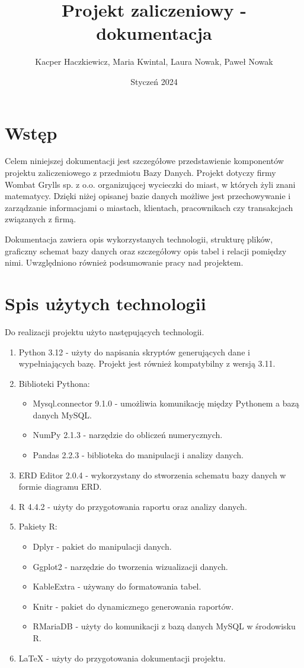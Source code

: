\documentclass{article}
\author{Kacper Haczkiewicz, Maria Kwintal, Laura Nowak, Paweł Nowak}
\title{\textbf{Projekt zaliczeniowy - dokumentacja}}
\date{Styczeń 2024}
\begin{document}
	
	\maketitle
	
	\section{Wstęp}
	
	Celem niniejszej dokumentacji jest szczegółowe przedstawienie komponentów projektu zaliczeniowego z przedmiotu Bazy Danych. Projekt dotyczy firmy Wombat Grylls sp. z o.o. organizującej wycieczki do miast, w których żyli znani matematycy. Dzięki niżej opisanej bazie danych możliwe jest przechowywanie i zarządzanie informacjami o miastach, klientach, pracownikach czy transakcjach związanych z firmą.
	
	Dokumentacja zawiera opis wykorzystanych technologii, strukturę plików, graficzny schemat bazy danych oraz szczegółowy opis tabel i relacji pomiędzy nimi. Uwzględniono również podsumowanie pracy nad projektem.
	
	\section{Spis użytych technologii}
	
	Do realizacji projektu użyto następujących technologii.
	\begin{enumerate}
		\item Python 3.12 - użyty do napisania skryptów generujących dane i wypełniających bazę. Projekt jest również kompatybilny z wersją 3.11.
		\item Biblioteki Pythona:
		\begin{itemize}
			\item Mysql.connector 9.1.0 - umożliwia komunikację między Pythonem a bazą danych MySQL.
			\item NumPy 2.1.3 - narzędzie do obliczeń numerycznych.
			\item Pandas 2.2.3 - biblioteka do manipulacji i analizy danych.
		\end{itemize}
		\item ERD Editor 2.0.4 - wykorzystany do stworzenia schematu bazy danych w formie diagramu ERD.
		\item R 4.4.2 - użyty do przygotowania raportu oraz analizy danych.
		\item Pakiety R:
		\begin{itemize}
			\item Dplyr - pakiet do manipulacji danych.
			\item Ggplot2 - narzędzie do tworzenia wizualizacji danych.
			\item KableExtra - używany do formatowania tabel.
			\item Knitr - pakiet do dynamicznego generowania raportów.
			\item RMariaDB - użyty do komunikacji z bazą danych MySQL w środowisku R.
		\end{itemize}
		\item LaTeX - użyty do przygotowania dokumentacji projektu.
	\end{enumerate}
	
\end{document}
